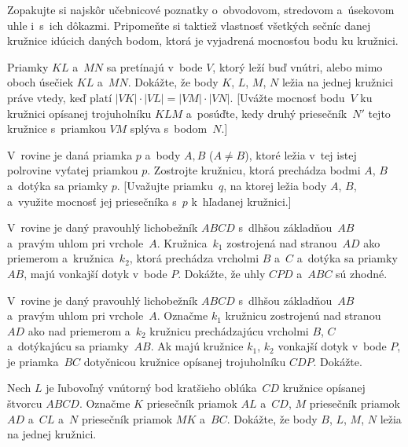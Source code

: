 {
{\everypar{}%
Zopakujte si najskôr učebnicové poznatky o~obvodovom, stredovom
a~úsekovom uhle i~s~ich dôkazmi. Pripomeňte si
taktiež vlastnosť všetkých sečníc danej kružnice idúcich daných bodom,
ktorá je vyjadrená mocnosťou bodu ku kružnici.
\par}
Priamky $KL$ a~$MN$ sa pretínajú v~bode $V$, ktorý leží buď vnútri, alebo
mimo oboch úsečiek $KL$ a~$MN$. Dokážte, že body $K$, $L$, $M$, $N$ ležia na jednej
kružnici práve vtedy, keď platí ${|VK|\cdot|VL|}=|VM|\cdot|VN|$. [Uvážte mocnosť
bodu~$V$ ku kružnici opísanej trojuholníku $KLM$ a~posúďte, kedy druhý priesečník~$N'$
tejto kružnice s~priamkou $VM$ splýva s~bodom~$N$.]

V~rovine je daná priamka $p$ a~body $A,B$ ($A\ne B$), ktoré ležia v~tej istej
polrovine vyťatej priamkou $p$. Zostrojte kružnicu,
ktorá prechádza bodmi $A$, $B$ a~dotýka sa priamky $p$. [Uvažujte priamku~$q$, na
ktorej ležia body $A$, $B$, a~využite mocnosť jej priesečníka s~$p$ k~hľadanej kružnici.]

V~rovine je daný pravouhlý lichobežník $ABCD$ s~dlhšou základňou~$AB$
a~pravým uhlom pri vrchole~$A$. Kružnica~$k_1$ zostrojená nad
stranou~$AD$ ako priemerom a~kružnica~$k_2$, ktorá prechádza vrcholmi $B$
a~$C$ a~dotýka sa priamky~$AB$, majú vonkajší dotyk v~bode $P$. Dokážte,
že uhly $CPD$ a~$ABC$ sú zhodné.
\vpravo{[52--B--I--5]}

V~rovine je daný pravouhlý lichobežník $ABCD$ s~dlhšou základňou~$AB$
a~pravým uhlom pri vrchole~$A$. Označme $k_1$ kružnicu zostrojenú
nad stranou~$AD$ ako nad priemerom a~$k_2$ kružnicu prechádzajúcu vrcholmi
$B$, $C$ a~dotýkajúcu sa priamky~$AB$. Ak majú kružnice $k_1$, $k_2$ vonkajší
dotyk v~bode $P$, je priamka~$BC$ dotyčnicou kružnice opísanej trojuholníku $CDP$.
Dokážte.
\vpravo{[52--B--II--4]}

\D
Nech $L$ je ľubovoľný vnútorný bod kratšieho oblúka~$CD$ kružnice opísanej
štvorcu $ABCD$. Označme $K$ priesečník priamok $AL$ a~$CD$,
$M$ priesečník priamok $AD$ a~$CL$ a~$N$ priesečník priamok $MK$ a~$BC$. Dokážte,
že body $B$, $L$, $M$, $N$ ležia na jednej kružnici.
\vpravo{[53--A--III--5]}
}

